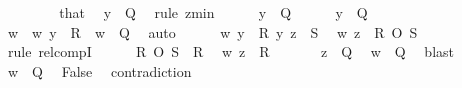 \begin{isabellebody}
\ \ \isamarkupfalse%
\isanewline
\ \ \ \ \isamarkupfalse%
\ that\ \isamarkupfalse%
\ {\isachardoublequoteopen}y\ {\isasymnotin}\ {\isacharquery}{\kern0pt}Q{\isacharprime}{\kern0pt}{\isachardoublequoteclose}\ \isamarkupfalse%
\ {\isacharparenleft}{\kern0pt}rule\ zmin{\isacharparenright}{\kern0pt}\isanewline
\ \ \ \ \isamarkupfalse%
\ {\isachardoublequoteopen}y\ {\isasymin}\ Q{\isachardoublequoteclose}\isanewline
\ \ \ \ \isamarkupfalse%
\ {\isacartoucheopen}y\ {\isasymnotin}\ {\isacharquery}{\kern0pt}Q{\isacharprime}{\kern0pt}{\isacartoucheclose}\ \isamarkupfalse%
\ w\ \ {\isachardoublequoteopen}{\isacharparenleft}{\kern0pt}w{\isacharcomma}{\kern0pt}\ y{\isacharparenright}{\kern0pt}\ {\isasymin}\ R{\isachardoublequoteclose}\ \ {\isachardoublequoteopen}w\ {\isasymin}\ Q{\isachardoublequoteclose}\ \isamarkupfalse%
\ auto\isanewline
\ \ \ \ \isamarkupfalse%
\ {\isacartoucheopen}{\isacharparenleft}{\kern0pt}w{\isacharcomma}{\kern0pt}\ y{\isacharparenright}{\kern0pt}\ {\isasymin}\ R{\isacartoucheclose}\ {\isacartoucheopen}{\isacharparenleft}{\kern0pt}y{\isacharcomma}{\kern0pt}\ z{\isacharparenright}{\kern0pt}\ {\isasymin}\ S{\isacartoucheclose}\ \isamarkupfalse%
\ {\isachardoublequoteopen}{\isacharparenleft}{\kern0pt}w{\isacharcomma}{\kern0pt}\ z{\isacharparenright}{\kern0pt}\ {\isasymin}\ R\ O\ S{\isachardoublequoteclose}\ \isamarkupfalse%
\ {\isacharparenleft}{\kern0pt}rule\ relcompI{\isacharparenright}{\kern0pt}\isanewline
\ \ \ \ \isamarkupfalse%
\ {\isacartoucheopen}R\ O\ S\ {\isasymsubseteq}\ R{\isacartoucheclose}\ \isamarkupfalse%
\ {\isachardoublequoteopen}{\isacharparenleft}{\kern0pt}w{\isacharcomma}{\kern0pt}\ z{\isacharparenright}{\kern0pt}\ {\isasymin}\ R{\isachardoublequoteclose}\ \isacommand{{\isachardot}{\kern0pt}{\isachardot}{\kern0pt}}\isamarkupfalse%
\isanewline
\ \ \ \ \isamarkupfalse%
\ {\isacartoucheopen}z\ {\isasymin}\ {\isacharquery}{\kern0pt}Q{\isacharprime}{\kern0pt}{\isacartoucheclose}\ \isamarkupfalse%
\ {\isachardoublequoteopen}w\ {\isasymnotin}\ Q{\isachardoublequoteclose}\ \isamarkupfalse%
\ blast\isanewline
\ \ \ \ \isamarkupfalse%
\ {\isacartoucheopen}w\ {\isasymin}\ Q{\isacartoucheclose}\ \isamarkupfalse%
\ False\ \isamarkupfalse%
\ contradiction\isanewline
\ \ \isamarkupfalse%

\end{isabellebody}
